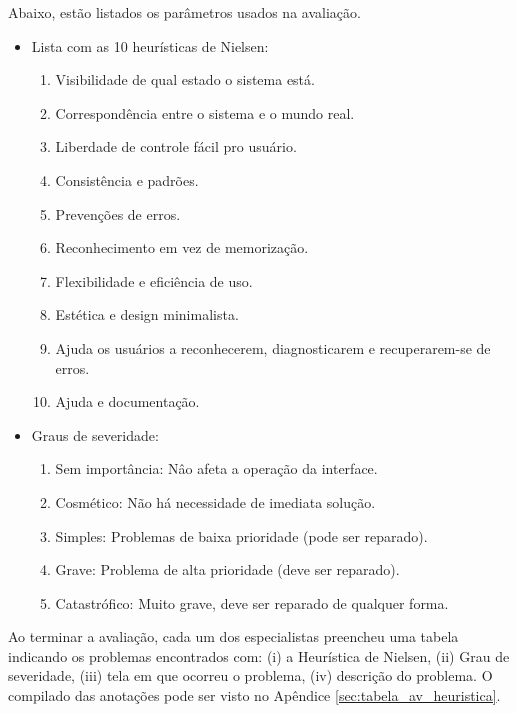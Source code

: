 Abaixo, estão listados os parâmetros usados na avaliação.

\begin{itemize}
    \item Lista com as 10 heurísticas de Nielsen:
    \begin{enumerate}
        \item Visibilidade de qual estado o sistema está.
        \item Correspondência entre o sistema e o mundo real.
        \item Liberdade de controle fácil pro usuário.
        \item Consistência e padrões.
        \item Prevenções de erros.
        \item Reconhecimento em vez de memorização.
        \item Flexibilidade e eficiência de uso.
        \item Estética e design minimalista.
        \item Ajuda os usuários a reconhecerem, diagnosticarem e recuperarem-se de erros.
        \item Ajuda e documentação.
    \end{enumerate}

    \item Graus de severidade:
    \begin{enumerate}
        \addtocounter{enumi}{-1} %
        \item Sem importância: Nâo afeta a operação da interface.
        \item Cosmético: Não há necessidade de imediata solução.
        \item Simples: Problemas de baixa prioridade (pode ser reparado).
        \item Grave: Problema de alta prioridade (deve ser reparado).
        \item Catastrófico: Muito grave, deve ser reparado de qualquer forma.
    \end{enumerate}
\end{itemize}

Ao terminar a avaliação, cada um dos especialistas preencheu uma tabela indicando os problemas encontrados com: (i) a Heurística de Nielsen, (ii) Grau de severidade, (iii) tela em que ocorreu o problema, (iv) descrição do problema. O compilado das anotações pode ser visto no Apêndice \ref{sec:tabela_av_heuristica}.

